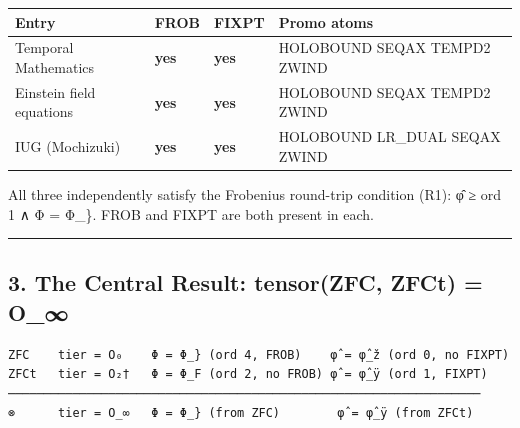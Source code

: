 {\def\LTcaptype{none} %
\begin{longtable}[]{@{}
  >{\raggedright\arraybackslash}p{}
  >{\raggedright\arraybackslash}p{}
  >{\raggedright\arraybackslash}p{}
  >{\raggedright\arraybackslash}p{}@{}}
\toprule\noalign{}
\begin{minipage}[b]{\linewidth}\raggedright
Entry
\end{minipage} & \begin{minipage}[b]{\linewidth}\raggedright
FROB
\end{minipage} & \begin{minipage}[b]{\linewidth}\raggedright
FIXPT
\end{minipage} & \begin{minipage}[b]{\linewidth}\raggedright
Promo atoms
\end{minipage} \\
\midrule\noalign{}
\endhead
\bottomrule\noalign{}
\endlastfoot
Temporal Mathematics & \textbf{yes} & \textbf{yes} & HOLOBOUND SEQAX
TEMPD2 ZWIND \\
Einstein field equations & \textbf{yes} & \textbf{yes} & HOLOBOUND SEQAX
TEMPD2 ZWIND \\
IUG (Mochizuki) & \textbf{yes} & \textbf{yes} & HOLOBOUND LR\_DUAL SEQAX
ZWIND \\
\end{longtable}
}

All three independently satisfy the Frobenius round-trip condition (R1):
φ̂ ≥ ord 1 ∧ Φ = Φ\_\}. FROB and FIXPT are both present in each.

\begin{center}\rule{0.5\linewidth}{0.5pt}\end{center}

\subsection{3. The Central Result: tensor(ZFC, ZFCt) =
O\_∞}\label{the-central-result-tensorzfc-zfct-o_}

\begin{verbatim}
ZFC    tier = O₀    Φ = Φ_} (ord 4, FROB)    φ̂ = φ̂_ž (ord 0, no FIXPT)
ZFCt   tier = O₂†   Φ = Φ_F (ord 2, no FROB) φ̂ = φ̂_ÿ (ord 1, FIXPT)
──────────────────────────────────────────────────────────────────
⊗      tier = O_∞   Φ = Φ_} (from ZFC)        φ̂ = φ̂_ÿ (from ZFCt)
\end{verbatim}


